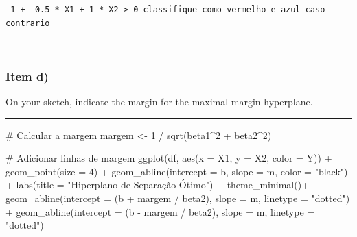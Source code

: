 \documentclass[
  a4paperpaper,
]{article}
\newenvironment{Shaded}{\begin{snugshade}}{\end{snugshade}}
\newcommand{\AttributeTok}[1]{\textcolor[rgb]{0.40,0.45,0.13}{#1}}
\newcommand{\CommentTok}[1]{\textcolor[rgb]{0.37,0.37,0.37}{#1}}
\newcommand{\DecValTok}[1]{\textcolor[rgb]{0.68,0.00,0.00}{#1}}
\newcommand{\FunctionTok}[1]{\textcolor[rgb]{0.28,0.35,0.67}{#1}}
\newcommand{\NormalTok}[1]{\textcolor[rgb]{0.00,0.23,0.31}{#1}}
\newcommand{\OtherTok}[1]{\textcolor[rgb]{0.00,0.23,0.31}{#1}}
\newcommand{\SpecialCharTok}[1]{\textcolor[rgb]{0.37,0.37,0.37}{#1}}
\newcommand{\StringTok}[1]{\textcolor[rgb]{0.13,0.47,0.30}{#1}}
\begin{document}
\begin{verbatim}
-1 + -0.5 * X1 + 1 * X2 > 0 classifique como vermelho e azul caso contrario
\end{verbatim}

~

\subsubsection{Item d)}\label{item-d-1}

On your sketch, indicate the margin for the maximal margin hyperplane.

\begin{center}\rule{0.5\linewidth}{0.5pt}\end{center}

\begin{Shaded}
\begin{Highlighting}[]
\CommentTok{\# Calcular a margem}
\NormalTok{margem }\OtherTok{\textless{}{-}} \DecValTok{1} \SpecialCharTok{/} \FunctionTok{sqrt}\NormalTok{(beta1}\SpecialCharTok{\^{}}\DecValTok{2} \SpecialCharTok{+}\NormalTok{ beta2}\SpecialCharTok{\^{}}\DecValTok{2}\NormalTok{)}

\CommentTok{\# Adicionar linhas de margem}
\FunctionTok{ggplot}\NormalTok{(df, }\FunctionTok{aes}\NormalTok{(}\AttributeTok{x =}\NormalTok{ X1, }\AttributeTok{y =}\NormalTok{ X2, }\AttributeTok{color =}\NormalTok{ Y)) }\SpecialCharTok{+}
  \FunctionTok{geom\_point}\NormalTok{(}\AttributeTok{size =} \DecValTok{4}\NormalTok{) }\SpecialCharTok{+}
  \FunctionTok{geom\_abline}\NormalTok{(}\AttributeTok{intercept =}\NormalTok{ b, }\AttributeTok{slope =}\NormalTok{ m, }\AttributeTok{color =} \StringTok{"black"}\NormalTok{) }\SpecialCharTok{+}
  \FunctionTok{labs}\NormalTok{(}\AttributeTok{title =} \StringTok{"Hiperplano de Separação Ótimo"}\NormalTok{) }\SpecialCharTok{+}
  \FunctionTok{theme\_minimal}\NormalTok{()}\SpecialCharTok{+}
  \FunctionTok{geom\_abline}\NormalTok{(}\AttributeTok{intercept =}\NormalTok{ (b }\SpecialCharTok{+}\NormalTok{ margem }\SpecialCharTok{/}\NormalTok{ beta2), }\AttributeTok{slope =}\NormalTok{ m, }\AttributeTok{linetype =} \StringTok{"dotted"}\NormalTok{) }\SpecialCharTok{+}
  \FunctionTok{geom\_abline}\NormalTok{(}\AttributeTok{intercept =}\NormalTok{ (b }\SpecialCharTok{{-}}\NormalTok{ margem }\SpecialCharTok{/}\NormalTok{ beta2), }\AttributeTok{slope =}\NormalTok{ m, }\AttributeTok{linetype =} \StringTok{"dotted"}\NormalTok{)}
\end{Highlighting}
\end{Shaded}
\end{document}
